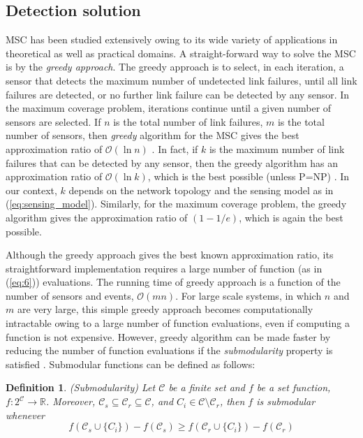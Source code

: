 \documentclass[twocolumn]{autart}
\newtheorem{definition}{\bf Definition}[section]
\begin{document}
\subsection{Detection solution}\label{sec:ds}\vspace{-0.35cm}
MSC has been studied extensively owing to its wide variety of applications in theoretical as well as practical domains. A straight-forward way to solve the MSC is by the \textit{greedy approach}. The greedy approach is to select, in each iteration, a sensor that detects the maximum number of undetected link failures, until all link failures are detected, or no further link failure can be detected by any sensor. In the maximum coverage problem, iterations continue until a given number of sensors are selected. If $n$ is the total number of link failures, $m$ is the total number of sensors, then \textit{greedy} algorithm for the MSC gives the best approximation ratio of $\mathcal{O}(\ln n)$ \cite{Garey1,Lund1}. In fact, if $k$ is the maximum number of link failures that can be detected by any sensor, then the greedy algorithm has an approximation ratio of $\mathcal{O}(\ln k)$, which is the best possible (unless P=NP) \cite{vazirani2013approximation}. In our context, $k$ depends on the network topology and the sensing model as in (\ref{eq:sensing_model}). Similarly, for the maximum coverage problem, the greedy algorithm gives the approximation ratio of $(1-1/e)$, which is again the best possible.

Although the greedy approach gives the best known approximation ratio, its straightforward implementation requires a large number of function (as in (\ref{eq:6})) evaluations. The running time of greedy approach is a function of the number of sensors and events, $\mathcal{O}(mn)$. For large scale systems, in which $n$ and $m$ are very large, this simple greedy approach becomes computationally intractable owing to a large number of function evaluations, even if computing a function is not expensive. However, greedy algorithm can be made faster by reducing the number of function evaluations if the \textit{submodularity} property is satisfied \cite{Minoux1}. Submodular functions can be defined as follows:

\begin{definition} (Submodularity)
\label{def:submodular}
Let $\mathcal{C}$ be a finite set and $f$ be a set function, $f:2^\mathcal{C}\longrightarrow \mathbb{R}$. Moreover, $\mathcal{C}_s\subseteq \mathcal{C}_r\subseteq\mathcal{C}$, and $C_i\in\mathcal{C}\setminus \mathcal{C}_r$, then $f$ is submodular whenever \vspace{-0.25cm}
\begin{equation}
\label{eq:submodular}
f\left(\mathcal{C}_s\cup\{C_i\}\right) - f(\mathcal{C}_s) \ge f\left(\mathcal{C}_r\cup\{C_i\}\right) - f(\mathcal{C}_r)
\end{equation}   
\end{definition} \vspace{-0.35cm}
\end{document}

